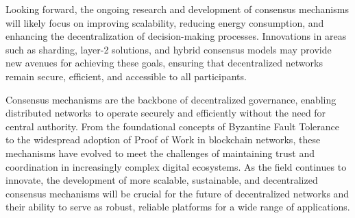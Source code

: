 \documentclass[12pt,twoside]{article}
\begin{document}
Looking forward, the ongoing research and development of consensus mechanisms will likely focus on improving scalability, reducing energy consumption, and enhancing the decentralization of decision-making processes. Innovations in areas such as sharding, layer-2 solutions, and hybrid consensus models may provide new avenues for achieving these goals, ensuring that decentralized networks remain secure, efficient, and accessible to all participants.

Consensus mechanisms are the backbone of decentralized governance, enabling distributed networks to operate securely and efficiently without the need for central authority. From the foundational concepts of Byzantine Fault Tolerance to the widespread adoption of Proof of Work in blockchain networks, these mechanisms have evolved to meet the challenges of maintaining trust and coordination in increasingly complex digital ecosystems. As the field continues to innovate, the development of more scalable, sustainable, and decentralized consensus mechanisms will be crucial for the future of decentralized networks and their ability to serve as robust, reliable platforms for a wide range of applications.


\end{document}
